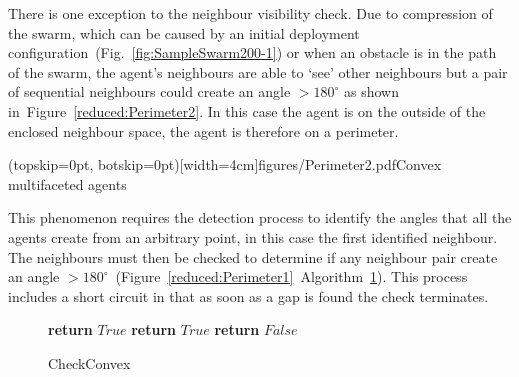\documentclass{ieeeaccess}
\begin{document}
There is one exception to the neighbour visibility check. Due to compression of the swarm, which can be caused by an initial deployment configuration~(Fig.~\ref{fig:SampleSwarm200-1}) or when an obstacle is in the path of the swarm, the agent's neighbours are able to `see' other neighbours but a pair of sequential neighbours could create an angle $> 180^\circ$ as shown in~Figure~\ref{reduced:Perimeter2}. In this case the agent is on the outside of the enclosed neighbour space, the agent is therefore on a perimeter. 


\Figure[t!](topskip=0pt, botskip=0pt)[width=4cm]{figures/Perimeter2.pdf}{Convex multifaceted agents\label{reduced:Perimeter2}}

This phenomenon requires the detection process to identify the angles that all the agents create from an arbitrary point, in this case the first identified neighbour. The neighbours must then be checked to determine if any neighbour pair create an angle $> 180^\circ$~(Figure~\ref{reduced:Perimeter1}~Algorithm~\ref{algo:checkConvex}). This process includes a short circuit in that as soon as a gap is found the check terminates. 

\begin{figure}
\begin{algorithmic}[1]
			\State \textbf{return} $True$ 
   	\EndIf
		\State \textbf{return} $True$ 
	\EndIf
\EndFor
\State \textbf{return} $False$ 
\EndProcedure
\end{algorithmic}
\caption{CheckConvex}
\label{algo:checkConvex}
\end{figure}

\end{document}
